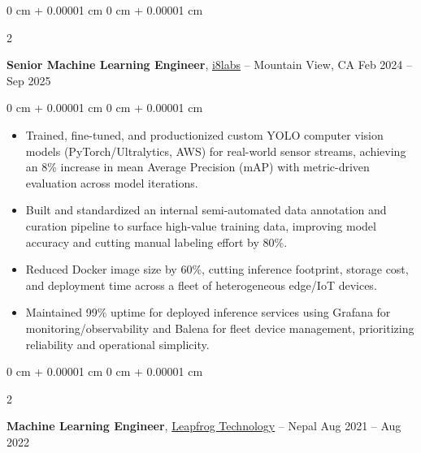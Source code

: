 \documentclass[10pt, letterpaper]{article}
\newenvironment{highlights}{
    \begin{itemize}[
        topsep=0.04 cm,
        parsep=0.04 cm,
        partopsep=0pt,
        itemsep=0pt,
        leftmargin=0 cm + 10pt
    ]
}{
    \end{itemize}
} %
\newenvironment{onecolentry}{
    \begin{adjustwidth}{
        0 cm + 0.00001 cm
    }{
        0 cm + 0.00001 cm
    }
}{
    \end{adjustwidth}
} %
\newenvironment{twocolentry}[2][]{
    \onecolentry
    \def\secondColumn{#2}
    \setcolumnwidth{\fill, 4.5 cm}
    \begin{paracol}{2}
}{
    \switchcolumn \raggedleft \secondColumn
    \end{paracol}
    \endonecolentry
} %
\begin{document}
        \vspace{0.12 cm}
        \begin{twocolentry}{
            Feb 2024 – Sep 2025
        }
            \textbf{Senior Machine Learning Engineer}, \href{https://i8labs.com/}{i8labs} -- Mountain View, CA\end{twocolentry}
        \vspace{0.06 cm}
        \begin{onecolentry}
            \begin{highlights}
                \item Trained, fine-tuned, and productionized custom YOLO computer vision models (PyTorch/Ultralytics, AWS) for real-world sensor streams, achieving an 8\% increase in mean Average Precision (mAP) with metric-driven evaluation across model iterations.
                \item Built and standardized an internal semi-automated data annotation and curation pipeline to surface high-value training data, improving model accuracy and cutting manual labeling effort by 80\%.
                \item Reduced Docker image size by 60\%, cutting inference footprint, storage cost, and deployment time across a fleet of heterogeneous edge/IoT devices.
                \item Maintained 99\% uptime for deployed inference services using Grafana for monitoring/observability and Balena for fleet device management, prioritizing reliability and operational simplicity.
            \end{highlights}
        \end{onecolentry}


        \vspace{0.12 cm}

        \begin{twocolentry}{
            Aug 2021 – Aug 2022
        }
            \textbf{Machine Learning Engineer}, \href{https://www.lftechnology.com/}{Leapfrog Technology} -- Nepal\end{twocolentry}
\end{document}

